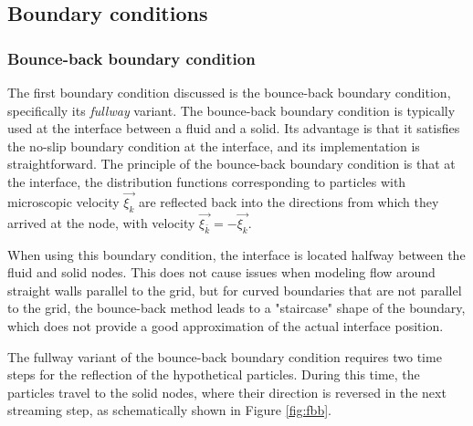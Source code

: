 \subsection{Boundary conditions}


\subsubsection{Bounce-back boundary condition}\label{bounce-back}
The first boundary condition discussed is the bounce-back boundary condition, specifically its \textit{fullway} variant. The bounce-back boundary condition is typically used at the interface between a fluid and a solid. Its advantage is that it satisfies the no-slip boundary condition at the interface, and its implementation is straightforward. The principle of the bounce-back boundary condition is that at the interface, the distribution functions corresponding to particles with microscopic velocity \( \vec{\xi_{k}} \) are reflected back into the directions from which they arrived at the node, with velocity \( \vec{\xi_{\bar{k}}} = -\vec{\xi_{k}} \).

When using this boundary condition, the interface is located halfway between the fluid and solid nodes. This does not cause issues when modeling flow around straight walls parallel to the grid, but for curved boundaries that are not parallel to the grid, the bounce-back method leads to a "staircase" shape of the boundary, which does not provide a good approximation of the actual interface position.

The fullway variant of the bounce-back boundary condition requires two time steps for the reflection of the hypothetical particles. During this time, the particles travel to the solid nodes, where their direction is reversed in the next streaming step, as schematically shown in Figure \ref{fig:fbb}.

